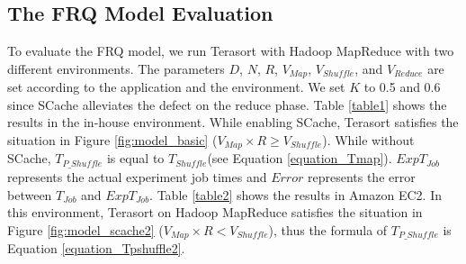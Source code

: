 \subsection{The FRQ Model Evaluation}\label{model_evaluation}
To evaluate the FRQ model, we run Terasort with Hadoop MapReduce with two different environments.
The parameters \(D\), \(N\), \(R\), \(V_{Map}\), \(V_{Shuffle}\), and \(V_{Reduce}\) are set according to the application and the environment.
We set \(K\) to 0.5 and 0.6 since SCache alleviates the defect on the reduce phase.
Table \ref{table1} shows the results in the in-house environment.
While enabling SCache, Terasort satisfies the situation in Figure \ref{fig:model_basic} (\(V_{Map} \times R \ge V_{Shuffle}\)). 
While without SCache, \(T_{P\_Shuffle}\) is equal to \(T_{Shuffle}\)(see Equation \ref{equation_Tmap}).
\(ExpT_{Job}\) represents the actual experiment job times and
\(Error\) represents the error between \(T_{Job}\) and \(ExpT_{Job}\). 
Table \ref{table2} shows the results in Amazon EC2.
In this environment, Terasort on Hadoop MapReduce satisfies the situation in Figure \ref{fig:model_scache2} (\(V_{Map} \times R < V_{Shuffle}\)), thus the formula of \(T_{P\_Shuffle}\) is Equation \ref{equation_Tpshuffle2}. 

